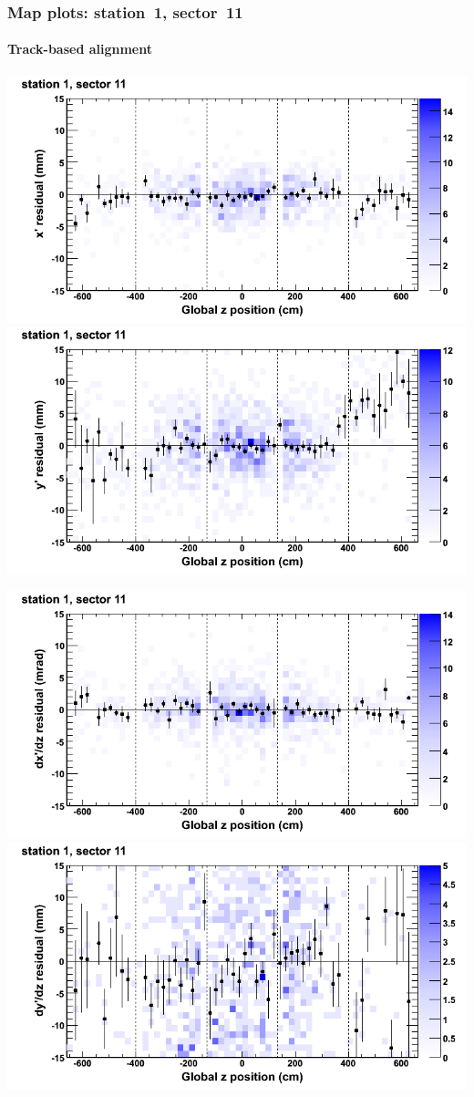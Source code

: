 \documentclass[compress]{beamer}
\begin{document}
\begin{frame}
\frametitle{Map plots: station~1, sector~11}
\framesubtitle{Track-based alignment}
\includegraphics[width=0.5\linewidth]{mapplots_re05/DTvsz_st1sec11_x.png}
\includegraphics[width=0.5\linewidth]{mapplots_re05/DTvsz_st1sec11_y.png}

\includegraphics[width=0.5\linewidth]{mapplots_re05/DTvsz_st1sec11_dxdz.png}
\includegraphics[width=0.5\linewidth]{mapplots_re05/DTvsz_st1sec11_dydz.png}
\end{frame}
\end{document}
